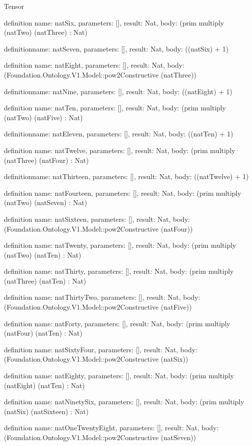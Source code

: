 \begin{lexlean}{Tensor}
\begin{semanticmodule}
definition{
  name: natSix,
  parameters: [],
  result: Nat,
  body: (prim multiply (natTwo) (natThree) : Nat)
}

definition{name: natSeven, parameters: [], result: Nat, body: ((natSix) + 1)}

definition{
  name: natEight,
  parameters: [],
  result: Nat,
  body: (Foundation.Ontology.V1.Model::pow2Constructive (natThree))
}

definition{name: natNine, parameters: [], result: Nat, body: ((natEight) + 1)}

definition{
  name: natTen,
  parameters: [],
  result: Nat,
  body: (prim multiply (natTwo) (natFive) : Nat)
}

definition{name: natEleven, parameters: [], result: Nat, body: ((natTen) + 1)}

definition{
  name: natTwelve,
  parameters: [],
  result: Nat,
  body: (prim multiply (natThree) (natFour) : Nat)
}

definition{name: natThirteen, parameters: [], result: Nat, body: ((natTwelve) + 1)}

definition{
  name: natFourteen,
  parameters: [],
  result: Nat,
  body: (prim multiply (natTwo) (natSeven) : Nat)
}

definition{
  name: natSixteen,
  parameters: [],
  result: Nat,
  body: (Foundation.Ontology.V1.Model::pow2Constructive (natFour))
}

definition{
  name: natTwenty,
  parameters: [],
  result: Nat,
  body: (prim multiply (natTwo) (natTen) : Nat)
}

definition{
  name: natThirty,
  parameters: [],
  result: Nat,
  body: (prim multiply (natThree) (natTen) : Nat)
}

definition{
  name: natThirtyTwo,
  parameters: [],
  result: Nat,
  body: (Foundation.Ontology.V1.Model::pow2Constructive (natFive))
}

definition{
  name: natForty,
  parameters: [],
  result: Nat,
  body: (prim multiply (natFour) (natTen) : Nat)
}

definition{
  name: natSixtyFour,
  parameters: [],
  result: Nat,
  body: (Foundation.Ontology.V1.Model::pow2Constructive (natSix))
}

definition{
  name: natEighty,
  parameters: [],
  result: Nat,
  body: (prim multiply (natEight) (natTen) : Nat)
}

definition{
  name: natNinetySix,
  parameters: [],
  result: Nat,
  body: (prim multiply (natSix) (natSixteen) : Nat)
}

definition{
  name: natOneTwentyEight,
  parameters: [],
  result: Nat,
  body: (Foundation.Ontology.V1.Model::pow2Constructive (natSeven))
}


\end{semanticmodule}
\end{lexlean}
